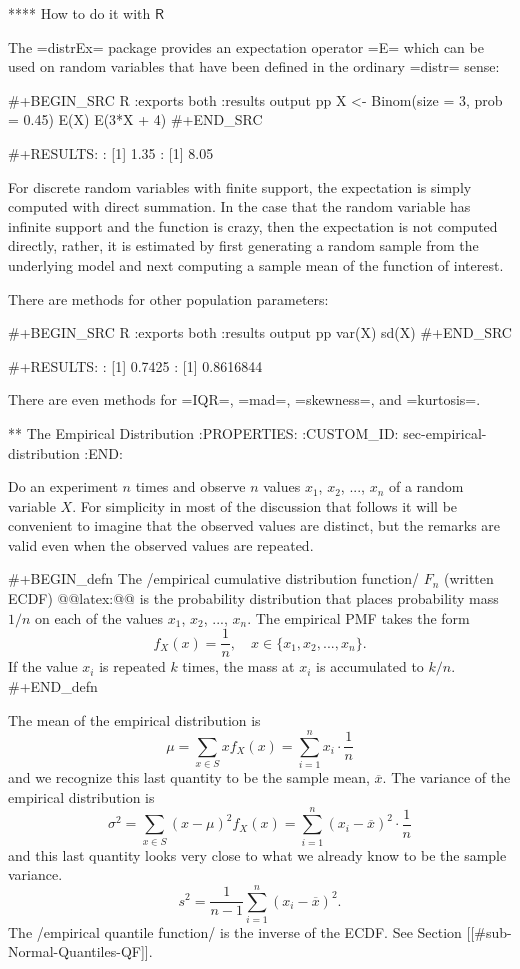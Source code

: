 **** How to do it with \(\mathsf{R}\)

The =distrEx= package \cite{distrEx} provides an expectation operator
=E= which can be used on random variables that have been defined in
the ordinary =distr= sense:

#+BEGIN_SRC R :exports both :results output pp  
X <- Binom(size = 3, prob = 0.45)
E(X)
E(3*X + 4)
#+END_SRC

#+RESULTS:
: [1] 1.35
: [1] 8.05

For discrete random variables with finite support, the expectation is
simply computed with direct summation. In the case that the random
variable has infinite support and the function is crazy, then the
expectation is not computed directly, rather, it is estimated by first
generating a random sample from the underlying model and next
computing a sample mean of the function of interest.

There are methods for other population parameters:

#+BEGIN_SRC R :exports both :results output pp  
var(X)
sd(X)
#+END_SRC

#+RESULTS:
: [1] 0.7425
: [1] 0.8616844

There are even methods for =IQR=, =mad=, =skewness=, and =kurtosis=.

** The Empirical Distribution
:PROPERTIES:
:CUSTOM_ID: sec-empirical-distribution
:END:

Do an experiment \(n\) times and observe \(n\) values \(x_{1}\),
\(x_{2}\), ..., \(x_{n}\) of a random variable \(X\). For simplicity
in most of the discussion that follows it will be convenient to
imagine that the observed values are distinct, but the remarks are
valid even when the observed values are repeated.

#+BEGIN_defn
The /empirical cumulative distribution function/ \(F_{n}\) (written
ECDF) @@latex:@@ is the probability distribution
that places probability mass \(1/n\) on each of the values \(x_{1}\),
\(x_{2}\), ..., \(x_{n}\). The empirical PMF takes the form
\begin{equation} 
f_{X}(x)=\frac{1}{n},\quad x\in \{ x_{1},x_{2},...,x_{n} \}.
\end{equation}
If the value \(x_{i}\) is repeated \(k\) times, the mass at \(x_{i}\) is accumulated to \(k/n\).
#+END_defn

The mean of the empirical distribution is
\begin{equation}
\mu=\sum_{x\in S}xf_{X}(x)=\sum_{i=1}^{n}x_{i}\cdot\frac{1}{n}
\end{equation}
and we recognize this last quantity to be the sample mean, \(\overline{x}\). The variance of the empirical distribution is
\begin{equation}
\sigma^{2}=\sum_{x\in S}(x-\mu)^{2}f_{X}(x)=\sum_{i=1}^{n}(x_{i}-\overline{x})^{2}\cdot\frac{1}{n}
\end{equation}
and this last quantity looks very close to what we already know to be the sample variance.
\begin{equation}
s^{2}=\frac{1}{n-1}\sum_{i=1}^{n}(x_{i}-\overline{x})^{2}.
\end{equation}
The /empirical quantile function/ is the inverse of the ECDF. See
Section [[#sub-Normal-Quantiles-QF]].

